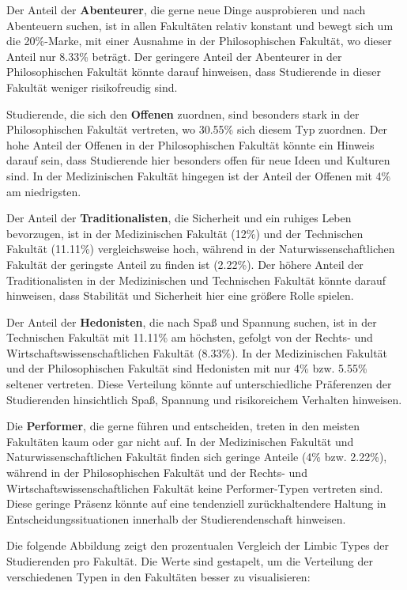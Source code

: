 \documentclass[german,report]{i1thesis}
\begin{document}
Der Anteil der \textbf{Abenteurer}, die gerne neue Dinge ausprobieren und nach Abenteuern suchen, ist in allen Fakultäten relativ konstant und bewegt sich um die 20\%-Marke, mit einer Ausnahme in der Philosophischen Fakultät, wo dieser Anteil nur 8.33\% beträgt. Der geringere Anteil der Abenteurer in der Philosophischen Fakultät könnte darauf hinweisen, dass Studierende in dieser Fakultät weniger risikofreudig sind.

Studierende, die sich den \textbf{Offenen} zuordnen, sind besonders stark in der Philosophischen Fakultät vertreten, wo 30.55\% sich diesem Typ zuordnen. Der hohe Anteil der Offenen in der Philosophischen Fakultät könnte ein Hinweis darauf sein, dass Studierende hier besonders offen für neue Ideen und Kulturen sind. In der Medizinischen Fakultät hingegen ist der Anteil der Offenen mit 4\% am niedrigsten.

Der Anteil der \textbf{Traditionalisten}, die Sicherheit und ein ruhiges Leben bevorzugen, ist in der Medizinischen Fakultät (12\%) und der Technischen Fakultät (11.11\%) vergleichsweise hoch, während in der Naturwissenschaftlichen Fakultät der geringste Anteil zu finden ist (2.22\%). Der höhere Anteil der Traditionalisten in der Medizinischen und Technischen Fakultät könnte darauf hinweisen, dass Stabilität und Sicherheit hier eine größere Rolle spielen.

Der Anteil der \textbf{Hedonisten}, die nach Spaß und Spannung suchen, ist in der Technischen Fakultät mit 11.11\% am höchsten, gefolgt von der Rechts- und Wirtschaftswissenschaftlichen Fakultät (8.33\%). In der Medizinischen Fakultät und der Philosophischen Fakultät sind Hedonisten mit nur 4\% bzw. 5.55\% seltener vertreten. Diese Verteilung könnte auf unterschiedliche Präferenzen der Studierenden hinsichtlich Spaß, Spannung und risikoreichem Verhalten hinweisen.

Die \textbf{Performer}, die gerne führen und entscheiden, treten in den meisten Fakultäten kaum oder gar nicht auf. In der Medizinischen Fakultät und Naturwissenschaftlichen Fakultät finden sich geringe Anteile (4\% bzw. 2.22\%), während in der Philosophischen Fakultät und der Rechts- und Wirtschaftswissenschaftlichen Fakultät keine Performer-Typen vertreten sind. Diese geringe Präsenz könnte auf eine tendenziell zurückhaltendere Haltung in Entscheidungssituationen innerhalb der Studierendenschaft hinweisen.

Die folgende Abbildung zeigt den prozentualen Vergleich der Limbic Types der Studierenden pro Fakultät. Die Werte sind gestapelt, um die Verteilung der verschiedenen Typen in den Fakultäten besser zu visualisieren:
\end{document}
